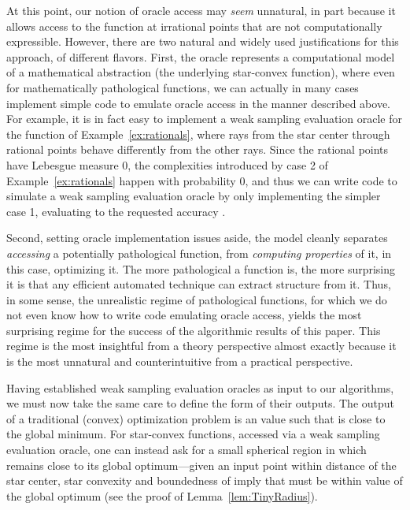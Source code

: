 \documentclass[11pt,letter]{article}
\numberwithin{nTheorems}{section}
\begin{document}
At this point, our notion of oracle access may \emph{seem} unnatural, in part because it allows access to the function at irrational points that are not computationally expressible.
However, there are two natural and widely used justifications for this approach, of different flavors.
First, the oracle represents a computational model of a mathematical abstraction (the underlying star-convex function), where even for mathematically pathological functions, we can actually in many cases implement simple code to emulate oracle access in the manner described above.
For example, it is in fact easy to implement a weak sampling evaluation oracle for the function of Example~\ref{ex:rationals}, where rays from the star center through rational points behave differently from the other rays.
Since the rational points have Lebesgue measure 0, the complexities introduced by case 2 of Example~\ref{ex:rationals} happen with probability 0, and thus we can write code to simulate a weak sampling evaluation oracle by only implementing the simpler case 1, evaluating  to the requested accuracy .




Second, setting oracle implementation issues aside, the model cleanly separates \emph{accessing} a potentially pathological function, from \emph{computing properties} of it, in this case, optimizing it. The more pathological a function is, the more surprising it is that any efficient automated technique can extract structure from it. Thus, in some sense, the unrealistic regime of pathological functions, for which we do not even know how to write code emulating oracle access, yields the most surprising regime for the success of the algorithmic results of this paper. This regime is the most insightful from a theory perspective almost exactly because it is the most unnatural and counterintuitive from a practical perspective.





Having established weak sampling evaluation oracles as input to our algorithms, we must now take the same care to define the form of their outputs.
The output of a traditional (convex) optimization problem is an  value such that  is close to the global minimum. For star-convex functions, accessed via a weak sampling evaluation oracle, one can instead ask for a small spherical region in which  remains close to its global optimum---given an input point  within distance  of the star center, star convexity and boundedness of  imply that  must be within value  of the global optimum (see the proof of Lemma~\ref{lem:TinyRadius}).
\end{document}
